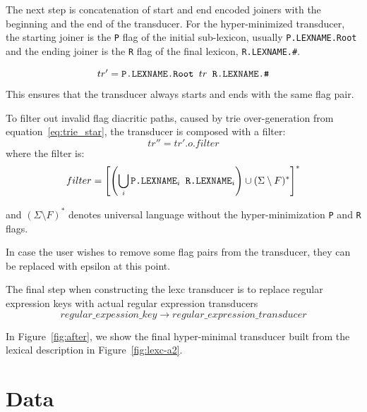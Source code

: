 \documentclass[11pt]{article}
\begin{document}
The next step is concatenation of start and end encoded joiners with the beginning and the end of the transducer. 
For the hyper-minimized transducer, the starting joiner is the \verb+P+ flag of the initial sub-lexicon, usually \texttt{P.LEXNAME.Root} and the ending joiner is the \verb+R+ flag of the final lexicon, \texttt{R.LEXNAME.\#}.

\begin{equation}\label{eq:joiners}
tr' = \verb+P.LEXNAME.Root + tr \verb+ R.LEXNAME.#+
\end{equation}
This ensures that the transducer always starts and ends with the same flag pair.

To filter out invalid flag diacritic paths, caused by trie over-generation from equation~\ref{eq:trie_star}, the transducer is composed with a filter:
\begin{equation}\label{eq:composition}
tr'' = tr' .o. filter
\end{equation}
where the filter is:
\begin{equation}\label{eq:filter}
filter = \left[ \left(\bigcup_{i} \verb+P.LEXNAME+_i \verb+ R.LEXNAME+_i \right) \cup (\Sigma \setminus F) ^*\right]^* 
\end{equation}

and $(\Sigma \setminus F)^*$ denotes universal language without the hyper-minimization \verb+P+ and \verb+R+ flags.


In case the user wishes to remove some flag pairs from the transducer, they can be replaced with epsilon at this point.


The final step when constructing the lexc transducer is to replace regular expression keys with actual regular expression transducers
\begin{equation}\label{eq:regex}
regular\_expession\_key \rightarrow regular\_expression\_transducer
\end{equation}

In Figure~\ref{fig:after}, we show the final hyper-minimal transducer built from the lexical description in Figure~\ref{fig:lexc-a2}. 



\section{Data}
\label{sec:data}
\end{document}
